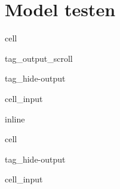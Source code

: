 \documentclass[letterpaper,10pt,english]{jupyterBook}
\begin{document}
\section{Model testen}
\label{\detokenize{02_NN/NeuralNet_2 (Mehrere Ausgaenge):model-testen}}
\begin{sphinxuseclass}{cell}
\begin{sphinxuseclass}{tag_output_scroll}
\begin{sphinxuseclass}{tag_hide-output}\begin{sphinxVerbatimInput}

\begin{sphinxuseclass}{cell_input}
\begin{sphinxVerbatim}[commandchars=\\\{\}]
 inline

   

\PYG{p}{[}\PYG{p}{]}

\PYG{p}{[}\PYG{p}{]} 
\end{sphinxVerbatim}

\end{sphinxuseclass}\end{sphinxVerbatimInput}

\end{sphinxuseclass}
\end{sphinxuseclass}
\end{sphinxuseclass}
\begin{sphinxuseclass}{cell}
\begin{sphinxuseclass}{tag_hide-output}\begin{sphinxVerbatimInput}

\begin{sphinxuseclass}{cell_input}
\begin{sphinxVerbatim}[commandchars=\\\{\}]
   
\end{sphinxVerbatim}

\end{sphinxuseclass}\end{sphinxVerbatimInput}

\end{sphinxuseclass}
\end{sphinxuseclass}
\end{document}
